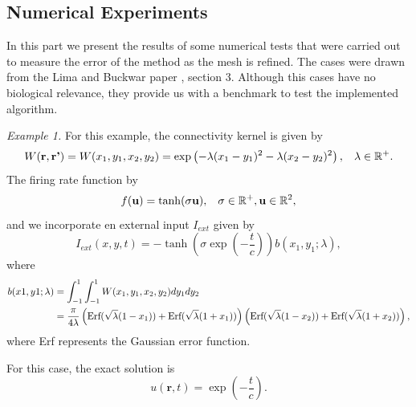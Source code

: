 \documentclass{uonmathreport}
\begin{document}
\subsection{Numerical Experiments} \label{subsec:2d_tests}
In this part we present the results of some numerical tests that were carried out to measure the error of the method as the mesh is refined. The cases were drawn from the Lima and Buckwar paper \cite{lima2015numerical}, section 3. Although this cases have no biological relevance, they provide us with a benchmark to test the implemented algorithm.

\textit{Example 1.} For this example, the connectivity kernel is given by
\begin{equation}\label{eqn:2d_test1_W}
W(\textbf{r},\textbf{r'}) = W(x_1,y_1,x_2,y_2) = \exp\left(-\lambda (x_1- y_1)^2 - \lambda (x_2-y_2)^2\right), \hspace{3mm} \lambda \in \mathbb{R}^+.
\end{equation}
The firing rate function by
\begin{equation}\label{eqn:2d_test1_frate}
	f(\mathbf{u}) = \tanh(\sigma \mathbf{u}), \hspace{3mm} \sigma \in \mathbb{R}^+, \mathbf{u} \in \mathbb{R}^2,
\end{equation}
and we incorporate en external input $I_{ext}$ given by
\begin{equation}\label{eqn:2d_test1_Iext}
	I_{ext}(x,y,t) = -\tanh\left( \sigma \exp \left( -\frac{t}{c}\right)\right) b(x_1,y_1;\lambda),
\end{equation}
where
\begin{equation}\label{eqn:2d_test1_b}
\begin{split}
	b(x1,y1;\lambda) &= \int_{-1}^{1} \int_{-1}^{1} W(x_1,y_1,x_2,y_2)dy_1dy_2\\
	&=\frac{\pi}{4\lambda}\left( \textnormal{Erf}(\sqrt{\lambda}(1-x_1)) + \textnormal{Erf}(\sqrt{\lambda}(1+x_1))\right) \left( \textnormal{Erf}(\sqrt{\lambda}(1-x_2)) + \textnormal{Erf}(\sqrt{\lambda}(1+x_2))\right),
\end{split}
\end{equation}
where Erf represents the Gaussian error function.

For this case, the exact solution is
\begin{equation}
	u(\textbf{r}, t) = \exp \left( - \frac{t}{c}\right).
\end{equation}
\end{document}
